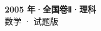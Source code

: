 \documentclass[zihao=-4, a4paper]{ctexart}
\begin{document}
\begin{center}
  {\Large\bfseries 2005 年·全国卷Ⅱ·理科}\\[4pt]
  {\large 数学 · 试题版}
\end{center}
\medskip
{}

\end{document}
